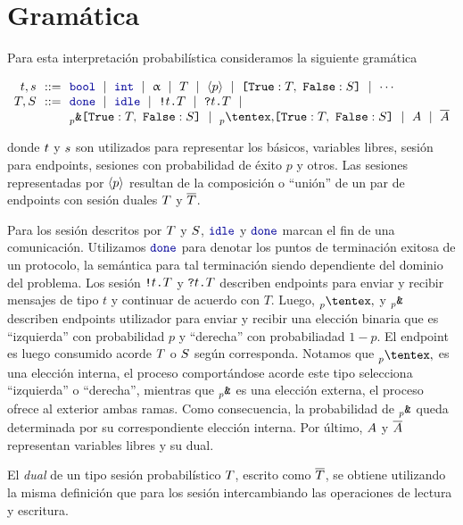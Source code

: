 \section{Gramática}

Para esta interpretación probabilística consideramos la siguiente gramática

\[
\begin{array}{@{}r@{~~}c@{~~}l@{}}
\TypeT, \TypeS & ::= &
\tbool
\rulemid \tint
\rulemid \tvar
\rulemid \SessionType
\rulemid \ClosedSessionType
\rulemid \BinaryLabels{\SessionTypeT}{\SessionTypeS}
\rulemid \cdots
\\
\SessionTypeT, \SessionTypeS & ::= &
\Done
\rulemid \Idle
\rulemid \Out\Type\SessionType
\rulemid \In\Type\SessionType
\rulemid
\\
	& &
\BinaryPBranch[p]\SessionTypeT\SessionTypeS
\rulemid \BinaryPChoice[p]\SessionTypeT\SessionTypeS
\rulemid \etvar
\rulemid \dual\etvar
\end{array}
\]

donde $t$ y $s$ son utilizados para representar los  básicos,
variables libres,  sesión para endpoints, sesiones con probabilidad de
éxito $p$ y otros. Las sesiones representadas por $\langle p \rangle$ resultan
de la composición o ``unión'' de un par de endpoints con  sesión duales
$T$ y $\overline{T}$.

Para los  sesión descritos por $T$ y $S$, $\Idle$
y $\Done$ marcan el fin de una comunicación. Utilizamos $\Done$ para denotar
los puntos de terminación exitosa de un protocolo, la semántica para tal
terminación siendo dependiente del dominio del problema. Los  sesión
${\texttt{\upshape!}}{t}\texttt{\upshape.}T$ y ${\texttt{\upshape?}}{t}\texttt{\upshape.}T$ describen endpoints para
enviar y recibir mensajes de tipo $t$ y continuar de acuerdo con $T$. Luego,
$\PChoice$ y
$\PBranch$ describen endpoints utilizador para
enviar y recibir una elección binaria que es ``izquierda'' con probabilidad $p$
y ``derecha'' con probabiliadad $1 - p$. El endpoint es luego consumido acorde
$T$ o $S$ según corresponda. Notamos que $\PChoice{}{}$
es una elección interna, el proceso comportándose acorde este tipo selecciona
``izquierda'' o ``derecha'', mientras que $\PBranch$ es una elección
externa, el proceso ofrece al exterior ambas ramas. Como consecuencia, la
probabilidad de $\PBranch$ queda determinada por su correspondiente
elección interna. Por último, $A$ y $\overline{A}$ representan variables
libres y su dual.

El \emph{dual} de un tipo sesión probabilístico $T$, escrito como
$\overline{T}$, se obtiene utilizando la misma definición que para los
 sesión intercambiando las operaciones de lectura y escritura.

